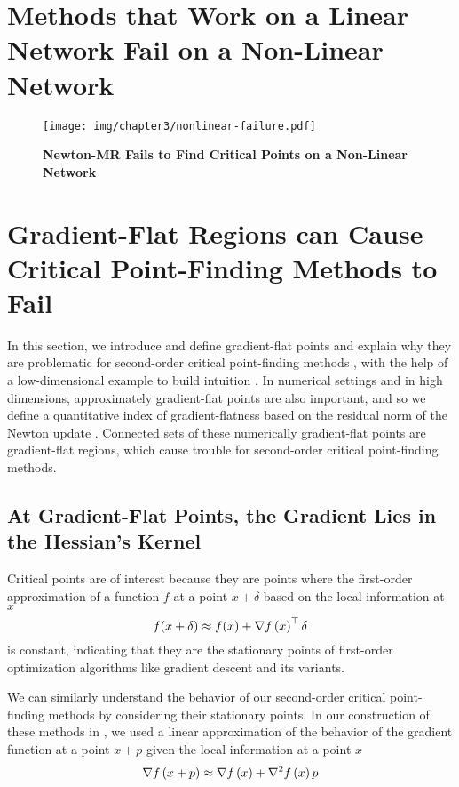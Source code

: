 \documentclass[../../thesis.tex]{subfiles}
\begin{document}
\section{Methods that Work on a Linear Network Fail on a Non-Linear Network}%

\begin{figure}[h]
	\begin{center}
		\texttt{[image: img/chapter3/nonlinear-failure.pdf]}
	\end{center}
	\caption{\textbf{Newton-MR Fails to Find Critical Points
	on a Non-Linear Network}}
\end{figure}

\section{Gradient-Flat Regions can Cause Critical Point-Finding Methods to Fail}%

In this section,
we introduce and define gradient-flat points and
explain why they are problematic for second-order
critical point-finding methods
,
with the help of a low-dimensional example
to build intuition
.
In numerical settings and in high dimensions,
approximately gradient-flat points are also important,
and so we define a quantitative index of gradient-flatness
based on the residual norm of the Newton update
.
Connected sets of these numerically gradient-flat points
are gradient-flat regions,
which cause trouble for
second-order critical point-finding methods.

\subsection{At Gradient-Flat Points, the Gradient Lies in the Hessian's Kernel}%

Critical points are of interest because
they are points where the first-order approximation
of a function  $f$ at a point
$x+\delta$ based on the local information at $x$
\begin{equation}
    f(x + \delta) \approx f(x) + \nabla f\left(x\right)^\top \delta
\end{equation}
is constant, indicating that they are the stationary points
of first-order optimization algorithms
like gradient descent and its variants.

We can similarly understand the behavior of our second-order
critical point-finding methods by considering their stationary points.
In our construction of these methods in
,
we used a linear approximation of the behavior
of the gradient function
at a point $x + p$ given the local information at a point $x$
\begin{equation}
    \nabla f\left(x + p\right) \approx \nabla f\left(x\right) + \nabla^2f\left(x\right)p
\end{equation}
\end{document}
